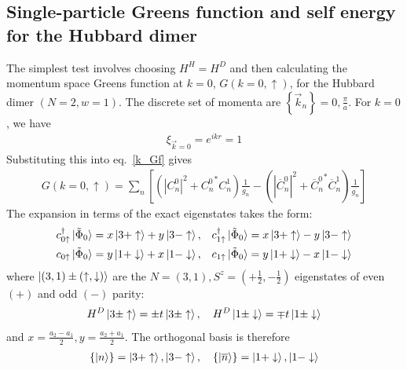 \documentclass[10pt]{report}
\numberwithin{equation}{section}
\begin{document}
\subsection{Single-particle Greens function and self energy for the Hubbard dimer}
The simplest test involves choosing $H^H = H^D$ and then calculating the momentum space Greens function at $k=0$, $G(k=0, \uparrow)$, for the Hubbard dimer \(\left(N = 2, w = 1 \right)\). The discrete set of momenta are \(\left\{ \vec k_n \right\} = 0, \frac{\pi}{a}\). For $k=0$, we have
\begin{equation}\begin{aligned}
	\xi_{\vec k = 0} = e^{ikr} = 1
\end{aligned}\end{equation}
Substituting this into eq.~\ref{k_Gf} gives
\begin{equation}\begin{aligned}
	\label{Gk_dim}
	G(k=0,\uparrow) = \sum_n\left[\left(|C^0_{n}|^2 + {C^0_{n}}^* C^1_{n} \right)\frac{1}{g_n} - \left(|\overline C^0_{n}|^2 + {\overline C^0_{n}}^* \overline C^1_{n}\right)\frac{1}{\overline{g_n}}\right]
\end{aligned}\end{equation}
The expansion in terms of the exact eigenstates takes the form:
\begin{equation}\begin{aligned}
	c^\dagger_{0 \uparrow}\ket{\tilde \Phi_0} = x\ket{3+ \uparrow} + y\ket{3- \uparrow}, && c^\dagger_{1 \uparrow}\ket{\tilde \Phi_0} = x\ket{3+ \uparrow} - y\ket{3- \uparrow}\\
	c_{0 \uparrow}\ket{\tilde \Phi_0} = y\ket{1+ \downarrow} + x\ket{1- \downarrow}, && c_{1 \uparrow}\ket{\tilde \Phi_0} = y\ket{1+ \downarrow} - x\ket{1- \downarrow}\\
\end{aligned}\end{equation}
where $\ket{(3,1)\pm (\uparrow, \downarrow)}$ are the $N=(3,1), S^z = (+\frac{1}{2}, -\frac{1}{2})$ eigenstates of even $(+)$ and odd \((-)\) parity:
\begin{equation}\begin{aligned}
	H^D\ket{3\pm \uparrow} = \pm t \ket{3\pm \uparrow}, ~ ~ ~H^D\ket{1\pm \downarrow} = \mp t \ket{1\pm \downarrow}\\
\end{aligned}\end{equation}
and \(x = \frac{a_2 - a_1}{2}, y = \frac{a_2 + a_1}{2}\). The orthogonal basis is therefore
\begin{equation}\begin{aligned}
	\left\{ \ket{n} \right\} = \ket{3+ \uparrow}, \ket{3- \uparrow}, ~ ~ ~\left\{ \ket{\overline n} \right\} = \ket{1+ \downarrow}, \ket{1- \downarrow}
\end{aligned}\end{equation}
\end{document}
